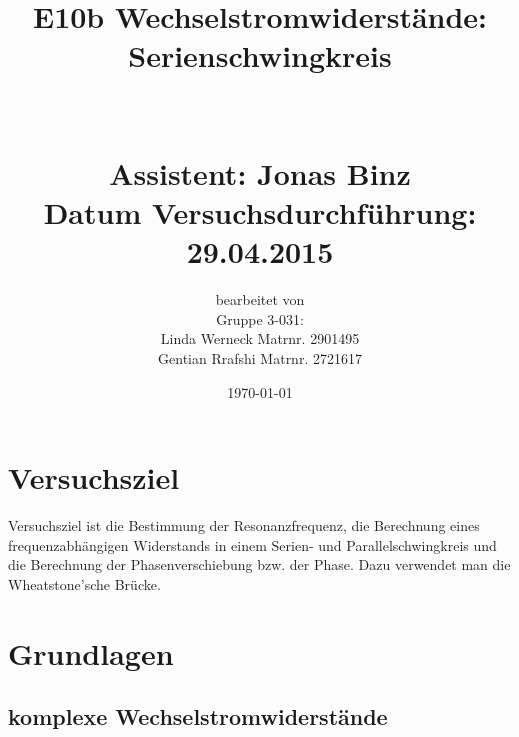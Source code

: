 \documentclass[fontsize=12pt]{scrartcl}
\begin{document}
\begin{minipage}{\textwidth}
\begin{center}\large
\title{E10b Wechselstromwiderstände: Serienschwingkreis \\
		~\\
		~\\
		Assistent: Jonas Binz \\
		Datum Versuchsdurchführung: \\
		29.04.2015}

\author{bearbeitet von\\
		Gruppe 3-031: \\
		Linda Werneck Matrnr. 2901495 \\
		Gentian Rrafshi Matrnr. 2721617 }
\date{\today}

\maketitle

\end{center}
\end{minipage}

\newpage

\tableofcontents

\newpage
\noindent

\section{ Versuchsziel}

Versuchsziel ist die Bestimmung der Resonanzfrequenz, die Berechnung eines frequenzabhängigen Widerstands in einem Serien- und Parallelschwingkreis und die Berechnung der Phasenverschiebung bzw. der Phase. Dazu verwendet man die Wheatstone’sche Brücke.

\section{ Grundlagen}

\subsection{komplexe Wechselstromwiderstände}
\end{document}
